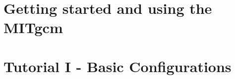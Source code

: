 
\chapter{Getting started and using the MITgcm}


\newpage

\chapter{Tutorial I - Basic Configurations}
\label{chap:tutorialI}


\newpage

\newpage

\newpage

\newpage

\newpage

\newpage

